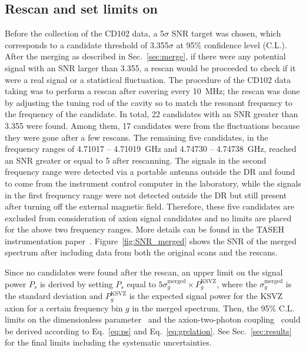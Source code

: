 \subsection{Rescan and set limits on \gagg} 
Before the collection of the CD102 data, a 5$\sigma$ SNR target was chosen, 
which corresponds to a candidate threshold of 3.355$\sigma$ at 95\% 
confidence level (C.L.).
 After the merging as described in Sec.~\ref{sec:merge}, if there were 
any potential signal with an SNR larger than 
3.355, a rescan would be proceeded to check if it were a real signal 
or a statistical fluctuation. 
The procedure of the CD102 data taking was to perform a rescan after 
covering every 10~MHz; the rescan was done by adjusting the tuning rod of the 
cavity so to match the resonant frequency to the frequency of the candidate. 
In total, 22 candidates with an SNR greater than 3.355 were found. 
Among them, 17 candidates were from the fluctuations because they were gone 
after a few rescans. 
The remaining five candidates, in the frequency ranges of 
4.71017 -- 4.71019~GHz and 4.74730 -- 4.74738~GHz, reached an SNR 
greater or equal to 5 after rescanning. The signals in the second frequency 
range were detected via a portable antenna outside the DR and found 
to come from the instrument control computer in the laboratory, while the 
signals in the first frequency range were not detected outside the DR but 
still present after turning off the external magnetic field. 
Therefore, these five candidates are excluded from consideration of 
axion signal candidates 
and no limits are placed for the above two frequency ranges.  
More details can be found in the 
TASEH instrumentation paper~\cite{TASEHInstrumentation}. 
Figure~\ref{fig:SNR_merged} shows the SNR of the merged spectrum after 
including data from both the original scans and the rescans. 

Since no candidates were found after the rescan, an upper limit on 
the signal power $P_s$ is derived by setting $P_s$ equal to 
$5\sigma_{g}^\text{merged}\times P_{g}^\text{KSVZ}$, where 
the $\sigma_{g}^\text{merged}$ is the standard deviation 
and $P_{g}^\text{KSVZ}$ is the expected signal power for the KSVZ axion 
for a certain frequency bin $g$ in the merged spectrum. 
Then, the 95\% C.L. limits on the dimensionless parameter 
\ggamma\ and the axion-two-photon coupling \gagg\ could be derived 
according to Eq.~\eqref{eq:ps} and Eq.~\eqref{eq:grelation}. 
See Sec.~\ref{sec:results} for the final limits including the systematic 
uncertainties.

